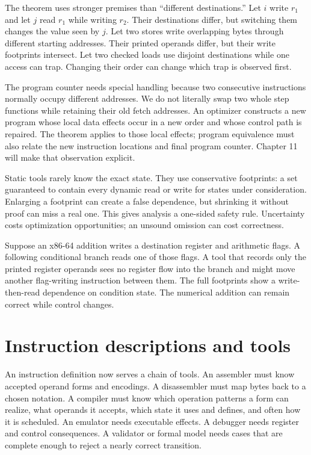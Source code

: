 The theorem uses stronger premises than ``different destinations.'' Let
\(i\) write \(r_1\) and let \(j\) read \(r_1\) while writing \(r_2\). Their
destinations differ, but switching them changes the value seen by \(j\). Let
two stores write overlapping bytes through different starting addresses.
Their printed operands differ, but their write footprints intersect. Let two
checked loads use disjoint destinations while one access can trap. Changing
their order can change which trap is observed first.

The program counter needs special handling because two consecutive
instructions normally occupy different addresses. We do not literally swap
two whole step functions while retaining their old fetch addresses. An
optimizer constructs a new program whose local data effects occur in a new order and
whose control path is repaired. The theorem applies to those local effects;
program equivalence must also relate the new instruction locations and final
program counter. Chapter 11 will make that observation explicit.

Static tools rarely know the exact state. They use conservative footprints:
a set guaranteed to contain every dynamic read or write for states under
consideration. Enlarging a footprint can create a false dependence, but
shrinking it without proof can miss a real one. This gives analysis a
one-sided safety rule. Uncertainty costs optimization opportunities; an
unsound omission can cost correctness.

\begin{example}[title={A flag defeats a register-only order test}]
Suppose an x86-64 addition writes a destination register and arithmetic flags.
A following conditional branch reads one of those flags. A tool that records
only the printed register operands sees no register flow into the branch and
might move another flag-writing instruction between them. The full footprints
show a write-then-read dependence on condition state. The numerical addition
can remain correct while control changes.
\end{example}

\section{Instruction descriptions and tools}

An instruction definition now serves a chain of tools. An assembler must know
accepted operand forms and encodings. A disassembler must map bytes back to a
chosen notation. A compiler must know which operation patterns a form can
realize, what operands it accepts, which state it uses and defines, and often
how it is scheduled. An emulator needs executable effects. A debugger needs
register and control consequences. A validator or formal model needs cases
that are complete enough to reject a nearly correct transition.

